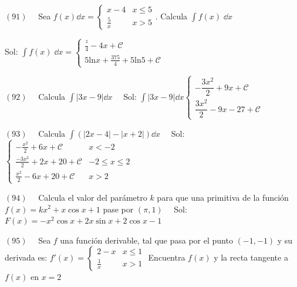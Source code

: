 {\begin{fleqn}
\end{fleqn}
\reqnomode
\renewcommand{\theequation}{\thechapter.\arabic{equation}}



\hspace{-7mm} $(91) \quad$  Sea  $\displaystyle f(x) \dd x= \begin{cases}
x-4 & x\le 5 \\
\frac 5 x & x>5 	
 \end{cases}$. Calcula $\displaystyle \int f(x)\; \dd x$
 
 \textcolor{gris}{Sol: $\displaystyle \int f(x)\; \dd x = \begin{cases}
 \frac {^2}{4}-4x + \mathcal C \\
 5 \mathrm{ln} x + \frac {375}{4}+ 5 \mathrm{ln}5 + \mathcal C	
 \end{cases}$}


\hspace{-7mm} $(92) \quad$ Calcula $\displaystyle \int |3x-9|\dd x \quad  $
\textcolor{gris}{Sol: $\displaystyle \int |3x-9|\dd x \begin{cases}
 -\dfrac {3x^2}{2}+9x+\mathcal C \\
 \dfrac {3x^2}{2}-9x-27+\mathcal C	
 \end{cases}$}

\hspace{-7mm} $(93) \quad$ Calcula $\displaystyle \int \left( |2x-4|-|x+2| \right) \dd x \quad $
\textcolor{gris}{ Sol:  $\begin{cases}
 -\frac {x^2}{2}+6x+\mathcal C & x<-2 \\
 \frac {-3x^2}{2}+2x+20 + \mathcal C & -2\le x \le 2 \\
 \frac {x^2}{2}-6x+	20 + \mathcal C & x>2
 \end{cases} $}

\hspace{-7mm} $(94) \quad$ Calcula el valor del parámetro $k$ para que una primitiva de la función $f(x)=k x^2+x \cos x+1$ pase por $(\pi,1)\quad $
\textcolor{gris}{ Sol: $F(x)=-x^2 \cos x +2x \sin x +2\cos x-1 $} 

\hspace{-7mm} $(95) \quad $ Sea $f$ una función derivable, tal que pasa por el punto $(-1,-1)$ y su derivada es: $\displaystyle f'(x)=\begin{cases}
2-x & x\le 1 \\
\frac 1 x & x>1	
\end{cases}$ Encuentra $f(x)$ y la recta tangente a $f(x)$ en $x=2$
 
}
